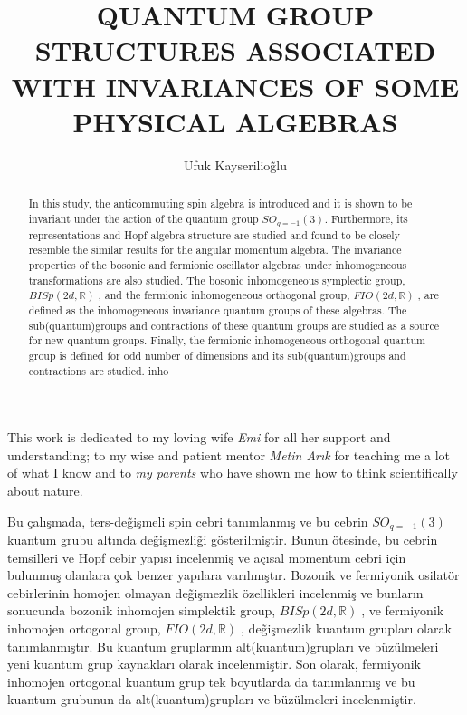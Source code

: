 \documentclass[12pt]{report}
\title{QUANTUM GROUP STRUCTURES ASSOCIATED WITH INVARIANCES OF SOME PHYSICAL ALGEBRAS}
\author{Ufuk Kayserilio\~ glu}
\def\IR{\mathbb{R}}
\def\FIO{$FIO(2d, \IR)\;$}
\def\BISp{$BISp(2d, \IR)\;$}
\begin{document}

\makephdtitle      %

\makeapprovalpage

\begin{acknowledgements}
This work is dedicated to my loving wife \textit{Emi} for all her support and understanding;
to my wise and patient mentor \textit{Metin Ar{\i}k} for teaching me a lot of what I know
and to \textit{my parents} who have shown me how to think scientifically about nature.
\end{acknowledgements}

\begin{abstract}
In this study, the anticommuting spin algebra is introduced and it is
shown to be invariant under the action of the quantum group $SO_{q = -1}(3)$.
Furthermore, its representations and Hopf algebra structure are studied and
found to be closely resemble the similar results for the angular momentum
algebra. The invariance properties of the bosonic and fermionic oscillator
algebras under inhomogeneous transformations are also studied. The bosonic
inhomogeneous symplectic group, \BISp, and the fermionic
inhomogeneous orthogonal group, \FIO, are defined as the inhomogeneous invariance
quantum groups of these algebras. The sub(quantum)groups and contractions of these
quantum groups are studied as a source for new quantum groups. Finally, the
fermionic inhomogeneous orthogonal quantum group is defined for odd number of
dimensions and its sub(quantum)groups and contractions are studied.
inho
\end{abstract}
%
%
\begin{ozet}
Bu \c{c}al{\i}\c{s}mada, ters-de\~{g}i\c{s}meli spin cebri tan{\i}mlanm{\i}\c{s} ve bu cebrin $SO_{q = -1}(3)$
kuantum grubu alt{\i}nda de\~{g}i\c{s}mezli\~{g}i g\"{o}sterilmi\c{s}tir. Bunun \"{o}tesinde, bu cebrin temsilleri
ve Hopf cebir yap{\i}s{\i} incelenmi\c{s} ve a\c{c}{\i}sal momentum cebri i\c{c}in bulunmu\c{s} olanlara
\c{c}ok benzer yap{\i}lara var{\i}lm{\i}\c{s}t{\i}r. Bozonik ve fermiyonik osilat\"{o}r cebirlerinin homojen
olmayan de\~{g}i\c{s}mezlik \"{o}zellikleri incelenmi\c{s} ve bunlar{\i}n sonucunda bozonik inhomojen
simplektik group, \BISp, ve fermiyonik inhomojen ortogonal group, \FIO,
de\~{g}i\c{s}mezlik kuantum gruplar{\i} olarak tan{\i}mlanm{\i}\c{s}t{\i}r. Bu kuantum gruplar{\i}n{\i}n alt(kuantum)gruplar{\i}
ve b\"{u}z\"{u}lmeleri yeni kuantum grup kaynaklar{\i} olarak incelenmi\c{s}tir. Son olarak, fermiyonik
inhomojen ortogonal kuantum grup tek boyutlarda da tan{\i}mlanm{\i}\c{s} ve bu kuantum grubunun da
alt(kuantum)gruplar{\i} ve b\"{u}z\"{u}lmeleri incelenmi\c{s}tir.
\end{ozet}
\end{document}

